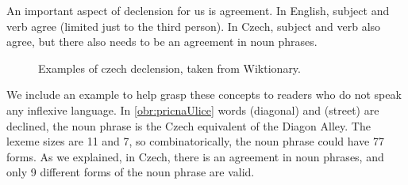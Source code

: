 An important aspect of declension for us is agreement. In English, subject and verb agree (limited just to the third person). In Czech, subject and verb also agree, but there also needs to be an agreement in noun phrases. 


\begin{figure}
\centering
{}
\qquad
{}

\caption{Examples of czech declension, taken from Wiktionary.\label{obr:pricnaUlice}}
\end{figure}


We include an example to help grasp these concepts to readers who do not speak any inflexive language. In \autoref{obr:pricnaUlice} words  (diagonal) and  (street) are declined, the noun phrase  is the Czech equivalent of the Diagon Alley. The lexeme sizes are 11 and 7, so combinatorically, the noun phrase could have 77 forms. As we explained, in Czech, there is an agreement in noun phrases, and only 9 different forms of the noun phrase  are valid. 



